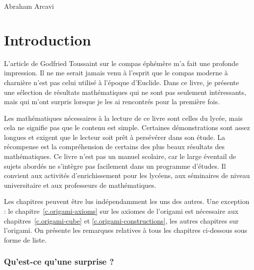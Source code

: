 \vspace{\baselineskip}
\begin{flushright}
{Abraham Arcavi}
\end{flushright}

\newpage

\rhead[\fancyplain{}{}]%
{\fancyplain{}{\thepage}}
\cfoot{}
\pagestyle{fancyplain}

\chapter*{Introduction}

L'article de Godfried Toussaint sur le \og compas éphémère\fg{}  \cite{toussaint} m'a fait une profonde impression. Il ne me serait jamais venu à l'esprit que le compas moderne à charnière n'est pas celui utilisé à l'époque d'Euclide. Dans ce livre, je présente une sélection de résultats mathématiques qui ne sont pas seulement intéressants, mais qui m'ont surpris lorsque je les ai rencontrés pour la première fois.

Les mathématiques nécessaires à la lecture de ce livre sont celles du lycée, mais cela ne signifie pas que le contenu est simple. Certaines démonstrations sont assez longues et exigent que le lecteur soit prêt à persévérer dans son étude. La récompense est la compréhension de certains des plus beaux résultats des mathématiques. Ce livre n'est pas un manuel scolaire, car le large éventail de sujets abordés ne s'intègre pas facilement dans un programme d'études. Il convient aux activités d'enrichissement pour les  lycéens, aux séminaires de niveau universitaire et aux professeurs de mathématiques.

 Les chapitres peuvent être lus indépendamment les uns des autres. Une exception : le chapitre~\ref{c.origami-axioms} sur les axiomes de l'origami est nécessaire aux chapitres~\ref{c.origami-cube} et \ref{c.origami-constructions}, les autres chapitres sur l'origami. On présente les remarques relatives à tous les chapitres ci-dessous sous forme de liste.

\subsection*{Qu'est-ce qu'une surprise ?}

